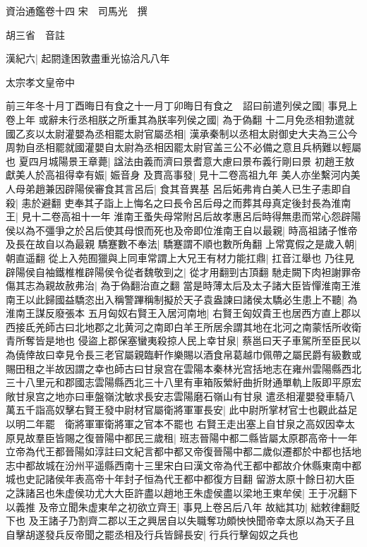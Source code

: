 資治通鑑卷十四
宋　司馬光　撰

胡三省　音註

漢紀六|{
	起閼逢困敦盡重光協洽凡八年}


太宗孝文皇帝中

前三年冬十月丁酉晦日有食之十一月丁卯晦日有食之　詔曰前遣列侯之國|{
	事見上卷上年}
或辭未行丞相朕之所重其為朕率列侯之國|{
	為于偽翻}
十二月免丞相勃遣就國乙亥以太尉灌嬰為丞相罷太尉官屬丞相|{
	漢承秦制以丞相太尉御史大夫為三公今周勃自丞相罷就國灌嬰自太尉為丞相因罷太尉官盖三公不必備之意且兵柄難以輕屬也}
夏四月城陽景王章薨|{
	諡法由義而濟曰景耆意大慮曰景布義行剛曰景}
初趙王敖獻美人於高祖得幸有娠|{
	娠音身}
及貫高事發|{
	見十二卷高祖九年}
美人亦坐繫河内美人母弟趙兼因辟陽侯審食其言呂后|{
	食其音異基}
呂后妬弗肯白美人已生子恚即自殺|{
	恚於避翻}
吏奉其子詣上上悔名之曰長令呂后母之而葬其母真定後封長為淮南王|{
	見十二卷高祖十一年}
淮南王蚤失母常附呂后故孝惠呂后時得無患而常心怨辟陽侯以為不彊爭之於呂后使其母恨而死也及帝即位淮南王自以最親|{
	時高祖諸子惟帝及長在故自以為最親}
驕蹇數不奉法|{
	驕蹇謂不順也數所角翻}
上常寛假之是歲入朝|{
	朝直遥翻}
從上入苑囿獵與上同車常謂上大兄王有材力能扛鼎|{
	扛音江舉也}
乃往見辟陽侯自袖鐵椎椎辟陽侯令從者魏敬剄之|{
	從才用翻剄古頂翻}
馳走闕下肉袒謝罪帝傷其志為親故赦弗治|{
	為于偽翻治直之翻}
當是時薄太后及太子諸大臣皆憚淮南王淮南王以此歸國益驕恣出入稱警蹕稱制擬於天子袁盎諫曰諸侯太驕必生患上不聽|{
	為淮南王謀反廢張本}
五月匈奴右賢王入居河南地|{
	右賢王匈奴貴王也居西方直上郡以西接氐羌師古曰北地郡之北黄河之南即白羊王所居余謂其地在北河之南蒙恬所收衛青所奪皆是地也}
侵盜上郡保塞蠻夷殺掠人民上幸甘泉|{
	蔡邕曰天子車駕所至臣民以為僥倖故曰幸見令長三老官屬親臨軒作樂賜以酒食帛葛越巾佩帶之屬民爵有級數或賜田租之半故因謂之幸也師古曰甘泉宫在雲陽本秦林光宫括地志在雍州雲陽縣西北三十八里元和郡國志雲陽縣西北三十八里有車箱阪縈紆曲折財通單軌上阪即平原宏敞甘泉宫之地亦曰車盤嶺沈敏求長安志雲陽磨石嶺山有甘泉}
遣丞相灌嬰發車騎八萬五千詣高奴擊右賢王發中尉材官屬衛將軍軍長安|{
	此中尉所掌材官士也觀此益足以明二年罷　衛將軍軍衛將軍之官本不罷也}
右賢王走出塞上自甘泉之高奴因幸太原見故羣臣皆賜之復晉陽中都民三歲租|{
	班志晉陽中都二縣皆屬太原郡高帝十一年立帝為代王都晉陽如淳註曰文紀言都中都又帝復晉陽中都二歲似遷都於中都也括地志中都故城在汾州平遥縣西南十三里宋白曰漢文帝為代王都中都故介休縣東南中都城也史記諸侯年表高帝十年封子恒為代王都中都復方目翻}
留游太原十餘日初大臣之誅諸呂也朱虚侯功尤大大臣許盡以趙地王朱虚侯盡以梁地王東牟侯|{
	王于况翻下以義推}
及帝立聞朱虚東牟之初欲立齊王|{
	事見上卷呂后八年}
故絀其功|{
	絀敕律翻貶下也}
及王諸子乃割齊二郡以王之興居自以失職奪功頗怏怏聞帝幸太原以為天子且自擊胡遂發兵反帝聞之罷丞相及行兵皆歸長安|{
	行兵行擊匈奴之兵也}
